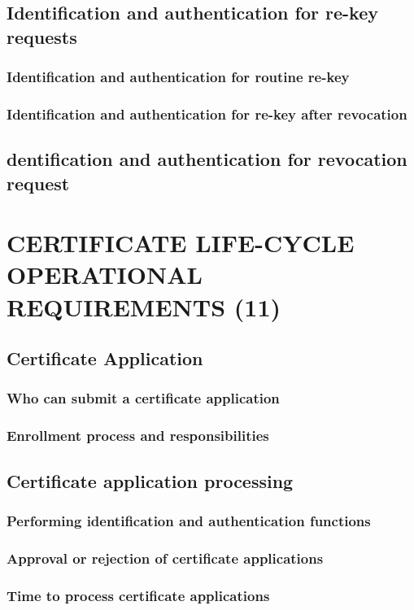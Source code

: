 \documentclass[10pt]{article}
\begin{document}
\subsection{Identification and authentication for re-key requests}
\subsubsection{Identification and authentication for routine re-key}
\subsubsection{Identification and authentication for re-key after revocation}
\subsection{dentification and authentication for revocation request}
\section{CERTIFICATE LIFE-CYCLE OPERATIONAL REQUIREMENTS (11)}
\subsection{Certificate Application}
\subsubsection{Who can submit a certificate application}
\subsubsection{Enrollment process and responsibilities}
\subsection{Certificate application processing}
\subsubsection{Performing identification and authentication functions}
\subsubsection{Approval or rejection of certificate applications}
\subsubsection{Time to process certificate applications}
\end{document}
